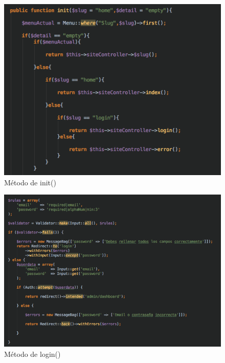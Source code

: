 \begin{figure}
\begin{center}
\includegraphics[width=1.0\textwidth]{imagenes/controller-init.png}
\caption{Método de init()}
\label{controller-init}
\end{center}
\end{figure}


\begin{figure}
\begin{center}
\includegraphics[width=1.0\textwidth]{imagenes/controller-login.png}
\caption{Método de login()}
\label{controller-login}
\end{center}
\end{figure}

